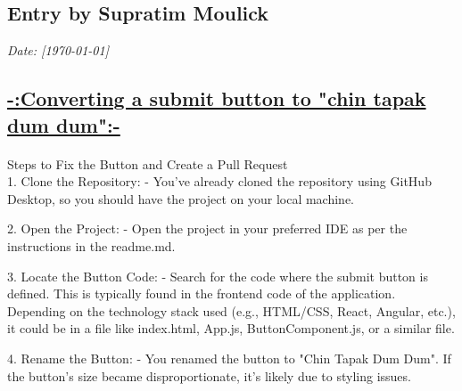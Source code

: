 \documentclass[a4paper,12pt]{article}
\begin{document}
\newpage
{}
\vspace{-2cm}
\subsection*{Entry by Supratim Moulick}
\textit{Date: [\today]}\\
\date{\today}
\floatBarrier 
\begin{center}
\section*{\uline{-:Converting a submit button to "chin tapak dum dum":-}}
\end{center}
\paragraph{}
\vspace{0.5cm}
Steps to Fix the Button and Create a Pull Request\\

1. Clone the Repository:
   - You’ve already cloned the repository using GitHub Desktop, so you should have the project on your local machine.\\
\vspace{1cm}

2. Open the Project:
   - Open the project in your preferred IDE as per the instructions in the readme.md.\\
\vspace{1cm}

3. Locate the Button Code:
   - Search for the code where the submit button is defined. This is typically found in the frontend code of the application. Depending on the technology stack used (e.g., HTML/CSS, React, Angular, etc.), it could be in a file like index.html, App.js, ButtonComponent.js, or a similar file.\\
\vspace{1cm}

4. Rename the Button:
   - You renamed the button to "Chin Tapak Dum Dum". If the button’s size became disproportionate, it’s likely due to styling issues.\\
\vspace{1cm}
\end{document}
